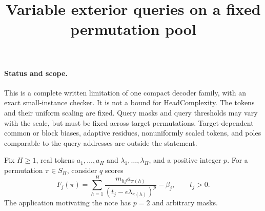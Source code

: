 \documentclass[11pt]{article}
\begin{document}
\title{Variable exterior queries on a fixed permutation pool}
\author{}\date{}\maketitle
\paragraph{Status and scope.}
This is a complete written limitation of one compact decoder family, with
an exact small-instance checker. It is not a bound for HeadComplexity.
The tokens and their uniform scaling are fixed. Query masks and query
thresholds may vary with the scale, but must be fixed across target
permutations. Target-dependent common or block biases, adaptive residues,
nonuniformly scaled tokens, and poles comparable to the query addresses
are outside the statement.

Fix $H\geq1$, real tokens $a_1,\ldots,a_H$ and
$\lambda_1,\ldots,\lambda_H$, and a positive integer $p$.
For a permutation $\pi\in S_H$, consider $q$ scores
\[
 F_j(\pi)=\sum_{h=1}^H
 \frac{m_{hj}a_{\pi(h)}}{(t_j-\epsilon\lambda_{\pi(h)})^p}
 -\beta_j,\qquad t_j>0.                         \tag{1}
\]
The application motivating the note has $p=2$ and arbitrary masks.
\end{document}

